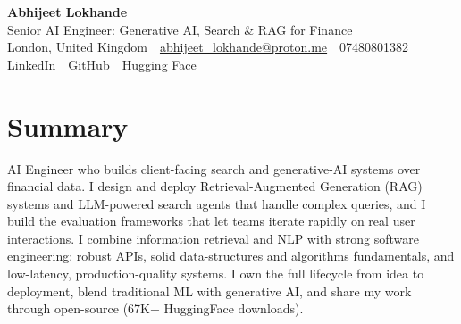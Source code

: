 \documentclass[10pt,a4paper]{article}
\newcommand{\sep}{\,\textcolor{accent!60}{\textbar}\,}
\begin{document}
\begin{center}
  {\fontsize{24}{26}\selectfont\bfseries Abhijeet Lokhande}\\[3pt]
  {\color{accent}\large Senior AI Engineer: Generative AI, Search \& RAG for Finance}\\[5pt]
  {\small
    London, United Kingdom \sep
    \href{mailto:abhijeet_lokhande@proton.me}{abhijeet\_lokhande@proton.me} \sep
    07480801382 \\[2pt]
    \href{https://www.linkedin.com/in/ablds/}{LinkedIn} \sep
    \href{https://github.com/abhijeetscode}{GitHub} \sep
    \href{https://huggingface.co/ab-ai}{Hugging Face}
  }
\end{center}
\vspace{2pt}

\section{Summary}
AI Engineer who builds client-facing search and generative-AI systems over financial data. I design and deploy Retrieval-Augmented Generation (RAG) systems and LLM-powered search agents that handle complex queries, and I build the evaluation frameworks that let teams iterate rapidly on real user interactions. I combine information retrieval and NLP with strong software engineering: robust APIs, solid data-structures and algorithms fundamentals, and low-latency, production-quality systems. I own the full lifecycle from idea to deployment, blend traditional ML with generative AI, and share my work through open-source (67K+ HuggingFace downloads).

\end{document}
